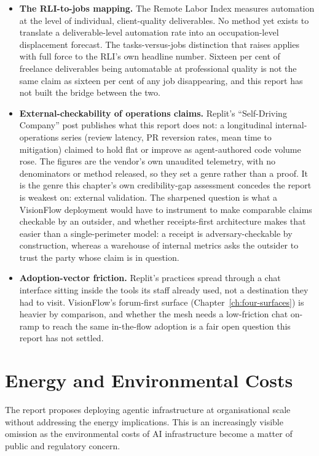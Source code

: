 \begin{itemize}
  \item \textbf{The RLI-to-jobs mapping.} The Remote Labor Index measures automation at the level of individual, client-quality deliverables. No method yet exists to translate a deliverable-level automation rate into an occupation-level displacement forecast. The tasks-versus-jobs distinction that \textcite{Chatterji2026} raises applies with full force to the RLI's own headline number. Sixteen per cent of freelance deliverables being automatable at professional quality is not the same claim as sixteen per cent of any job disappearing, and this report has not built the bridge between the two.
  \item \textbf{External-checkability of operations claims.} Replit's ``Self-Driving Company'' post \parencite{MasadKennedy2026} publishes what this report does not: a longitudinal internal-operations series (review latency, PR reversion rates, mean time to mitigation) claimed to hold flat or improve as agent-authored code volume rose. The figures are the vendor's own unaudited telemetry, with no denominators or method released, so they set a genre rather than a proof. It is the genre this chapter's own credibility-gap assessment concedes the report is weakest on: external validation. The sharpened question is what a VisionFlow deployment would have to instrument to make comparable claims checkable by an outsider, and whether receipts-first architecture makes that easier than a single-perimeter model: a receipt is adversary-checkable by construction, whereas a warehouse of internal metrics asks the outsider to trust the party whose claim is in question.
  \item \textbf{Adoption-vector friction.} Replit's practices spread through a chat interface sitting inside the tools its staff already used, not a destination they had to visit. VisionFlow's forum-first surface (Chapter~\ref{ch:four-surfaces}) is heavier by comparison, and whether the mesh needs a low-friction chat on-ramp to reach the same in-the-flow adoption is a fair open question this report has not settled.
\end{itemize}

\section{Energy and Environmental Costs}

The report proposes deploying agentic infrastructure at organisational scale without addressing the energy implications. This is an increasingly visible omission as the environmental costs of AI infrastructure become a matter of public and regulatory concern.


